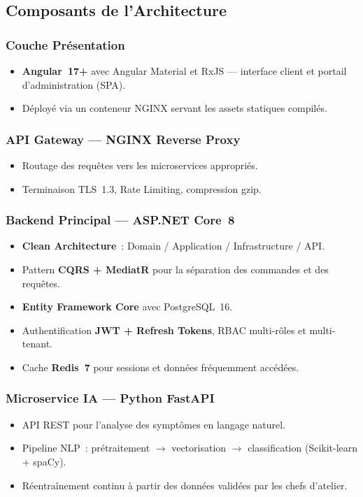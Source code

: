 \documentclass[12pt,a4paper]{report}
\begin{document}
\subsection{Composants de l'Architecture}

\subsubsection{Couche Pr\'{e}sentation}
\begin{itemize}
  \item \textbf{Angular~17+} avec Angular Material et RxJS ---
    interface client et portail d'administration (SPA).
  \item D\'{e}ploy\'{e} via un conteneur NGINX servant les assets
    statiques compil\'{e}s.
\end{itemize}

\subsubsection{API Gateway --- NGINX Reverse Proxy}
\begin{itemize}
  \item Routage des requ\^{e}tes vers les microservices appropri\'{e}s.
  \item Terminaison TLS~1.3, Rate Limiting, compression gzip.
\end{itemize}

\subsubsection{Backend Principal --- ASP.NET Core~8}
\begin{itemize}
  \item \textbf{Clean Architecture}~: Domain / Application /
    Infrastructure / API.
  \item Pattern \textbf{CQRS + MediatR} pour la s\'{e}paration des
    commandes et des requ\^{e}tes.
  \item \textbf{Entity Framework Core} avec PostgreSQL~16.
  \item Authentification \textbf{JWT + Refresh Tokens}, RBAC
    multi-r\^{o}les et multi-tenant.
  \item Cache \textbf{Redis~7} pour sessions et donn\'{e}es
    fr\'{e}quemment acc\'{e}d\'{e}es.
\end{itemize}

\subsubsection{Microservice IA --- Python FastAPI}
\begin{itemize}
  \item API REST pour l'analyse des sympt\^{o}mes en langage naturel.
  \item Pipeline NLP~: pr\'{e}traitement $\rightarrow$ vectorisation
    $\rightarrow$ classification (Scikit-learn + spaCy).
  \item R\'{e}entra\^{i}nement continu \`{a} partir des donn\'{e}es
    valid\'{e}es par les chefs d'atelier.
\end{itemize}
\end{document}
